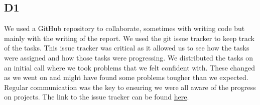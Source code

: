 \subsection*{D1}
    We used a GitHub repository to collaborate, sometimes with writing code but mainly with the writing of the report. We used the git issue tracker to keep track of the tasks. This issue tracker was critical as it allowed us to see how the tasks were assigned and how those tasks were progressing. We distributed the tasks on an initial call where we took problems that we felt confident with. These changed as we went on and might have found some problems tougher than we expected. Regular communication was the key to ensuring we were all aware of the progress on projects. The link to the issue tracker can be found  \href{https://github.com/drlim2u/ELE2024-Control-Coursework/issues}{here}.